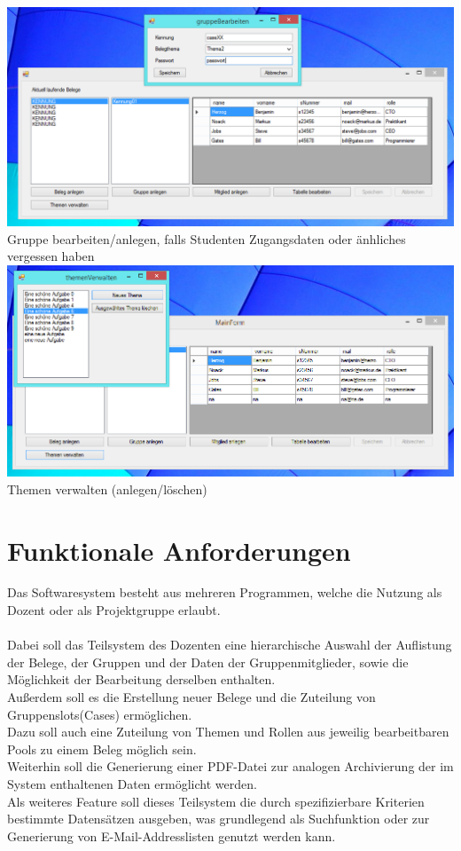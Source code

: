 \documentclass{article}
\begin{document}
\begin{center}
    \includegraphics[scale=0.6]{bilder/doz4.PNG}\\
    Gruppe bearbeiten/anlegen, falls Studenten Zugangsdaten oder änhliches vergessen haben \\
    
    \includegraphics[scale=0.6]{bilder/doz5.PNG}\\
    Themen verwalten (anlegen/löschen) \\
\end{center}

\section{Funktionale Anforderungen}
Das Softwaresystem besteht aus mehreren Programmen, welche die Nutzung als Dozent oder als Projektgruppe erlaubt.\\\\

Dabei soll das Teilsystem des Dozenten eine hierarchische Auswahl der Auflistung der Belege, der Gruppen und der Daten der Gruppenmitglieder, sowie die Möglichkeit der Bearbeitung derselben enthalten.\\
Außerdem soll es die Erstellung neuer Belege und die Zuteilung von Gruppenslots(Cases) ermöglichen.\\
Dazu soll auch eine Zuteilung von Themen und Rollen aus jeweilig bearbeitbaren Pools zu einem Beleg möglich sein.\\
Weiterhin soll die Generierung einer PDF-Datei zur analogen Archivierung der im System enthaltenen Daten ermöglicht werden.\\
Als weiteres Feature soll dieses Teilsystem die durch spezifizierbare Kriterien bestimmte Datensätzen ausgeben, was grundlegend als Suchfunktion oder zur Generierung von E-Mail-Addresslisten genutzt werden kann.\\\\
\end{document}
